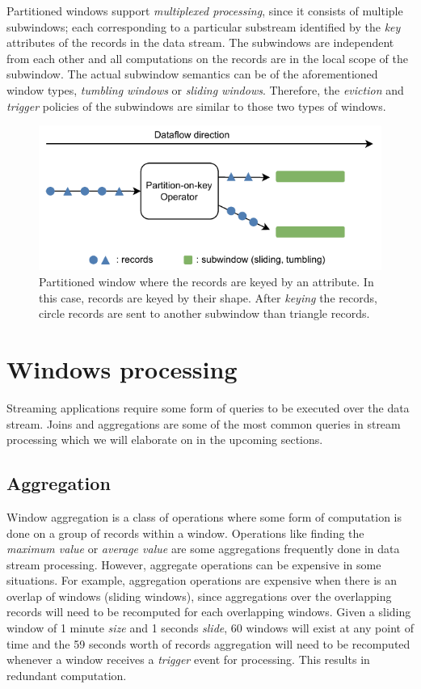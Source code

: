 Partitioned windows support \emph{multiplexed processing}, since it consists of  
multiple subwindows; each corresponding to a particular substream identified 
by the \emph{key} attributes of the records in the data stream. The subwindows 
are independent from each other and all computations on the records are in the local scope 
of the subwindow. The actual subwindow semantics can be of the aforementioned window types, \emph{tumbling windows} or \emph{sliding windows}. Therefore, the 
\emph{eviction} and \emph{trigger} policies of the subwindows 
are similar to those two types of windows. 


\begin{figure}[htpb]
    \centering
    \includegraphics[width=0.8\linewidth]{fig/partitioned_window.pdf}
    \caption{Partitioned window where the records are keyed by an attribute. In this case,
    records are keyed by their shape. After \emph{keying} the records, circle records are sent 
    to another subwindow than triangle records.}%
    \label{fig:partitioned_window}
\end{figure}
   

\section{Windows processing}
\label{sec:windows_processing}

Streaming applications require some form of queries to be executed over 
the data stream. Joins and aggregations are some of the most common queries 
in stream processing which we will elaborate on in the upcoming sections. 

\subsection{Aggregation}%
\label{sub:Aggregation}
Window aggregation is a class of operations where some form of computation 
is done on a group of records within a window. Operations like 
finding the \emph{maximum value} or \emph{average value} are some 
aggregations frequently done in data stream processing. However, 
aggregate operations can be expensive in some situations. 
For example, aggregation operations are expensive when there is 
an overlap of windows (sliding windows), since aggregations over the overlapping 
records will need to be recomputed for each overlapping windows. Given a sliding 
window of 1 minute \emph{size} and 1 seconds \emph{slide}, 60 windows will exist 
at any point of time and the 59 seconds worth of records aggregation will need 
to be recomputed whenever a window receives a \emph{trigger} event for processing. 
This results in redundant computation. 

